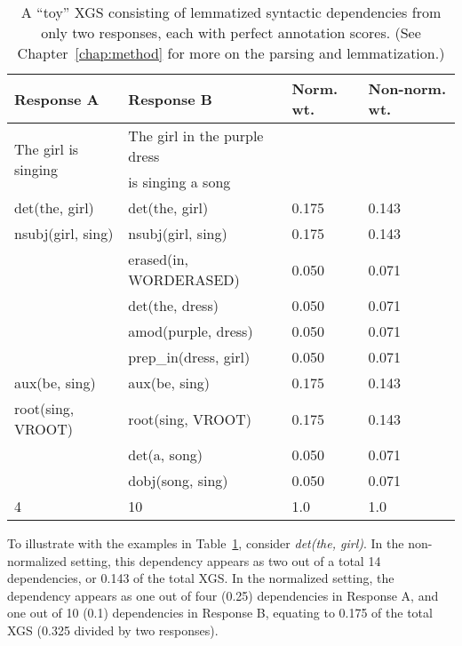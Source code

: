 \begin{table}[htb!]
\begin{center}
\begin{tabular}{|l|l|l|l|}
\hline
Response A & Response B & Norm. wt. & Non-norm. wt.\\
\hline
\multirow{2}{*}{The girl is singing} & The girl in the purple dress & & \\
& is singing a song & & \\
\hline
\hline
det(the, girl) & det(the, girl) & 0.175 & 0.143 \\
\hline
nsubj(girl, sing) & nsubj(girl, sing) & 0.175 & 0.143 \\
\hline
& erased(in, WORDERASED) & 0.050 & 0.071 \\
\hline
& det(the, dress) & 0.050 & 0.071 \\
\hline
& amod(purple, dress) & 0.050 & 0.071 \\
\hline
& prep\_in(dress, girl) & 0.050 & 0.071 \\
\hline
aux(be, sing) & aux(be, sing) & 0.175 & 0.143 \\
\hline
root(sing, VROOT) & root(sing, VROOT) & 0.175 & 0.143 \\
\hline
& det(a, song) & 0.050 & 0.071 \\
\hline
& dobj(song, sing) & 0.050 & 0.071 \\
\hline
\hline
4 & 10 & 1.0 & 1.0 \\
\hline
\end{tabular}
\caption{\label{tab:normalize-responses-deps} A ``toy'' XGS consisting of lemmatized syntactic dependencies from only two responses, each with perfect annotation scores. (See Chapter~\ref{chap:method} for more on the parsing and lemmatization.)}
\end{center}
\end{table}

To illustrate with the examples in Table~\ref{tab:normalize-responses-deps}, consider \textit{det(the, girl)}. In the non-normalized setting, this dependency appears as two out of a total 14 dependencies, or 0.143 of the total XGS. In the normalized setting, the dependency appears as one out of four (0.25) dependencies in Response A, and one out of 10 (0.1) dependencies in Response B, equating to 0.175 of the total XGS (0.325 divided by two responses).

